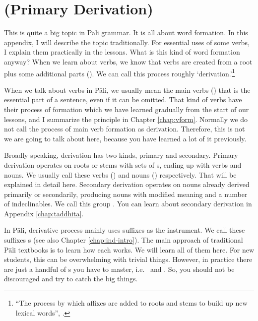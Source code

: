 \chapter{ (Primary Derivation)}\label{chap:kita}

This is quite a big topic in P\=ali grammar. It is all about word formation. In this appendix, I will describe the topic traditionally. For essential uses of some  verbs, I explain them practically in the lessons. What is this kind of word formation anyway? When we learn about verbs, we know that verbs are created from a root plus some additional parts (). We can call this process roughly `derivation.'\footnote{``The process by which affixes are added to roots and stems to build up new lexical words'', \citealp[pp.~128--9]{brownmiller:dict}.}

When we talk about verbs in P\=ali, we usually mean the main verbs () that is the essential part of a sentence, even if it can be omitted. That kind of verbs have their process of formation which we have learned gradually from the start of our lessons, and I summarize the principle in Chapter \ref{chap:vform}. Normally we do not call the process of main verb formation as derivation. Therefore, this is not we are going to talk about here, because you have learned a lot of it previously.

Broadly speaking, derivation has two kinds, primary and secondary. Primary derivation operates on roots or stems with sets of s, ending up with verbs and nouns. We usually call these  verbs () and  nouns () respectively. That will be explained in detail here. Secondary derivation operates on nouns already derived primarily or secondarily, producing nouns with modified meaning and a number of indeclinables. We call this group . You can learn about secondary derivation in Appendix \ref{chap:taddhita}.

In P\=ali, derivative process mainly uses suffixes as the instrument. We call these suffixes s (see also Chapter \ref{chap:ind-intro}). The main approach of traditional P\=ali textbooks is to learn how each  works. We will learn all of them here. For new students, this can be overwhelming with trivial things. However, in practice there are just a handful of s you have to master, i.e.\  and . So, you should not be discouraged and try to catch the big things.

